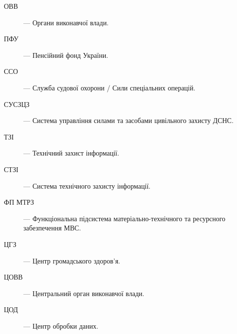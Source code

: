 \begin{description}
    \item[ОВВ] — Органи виконавчої влади.
    \item[ПФУ] — Пенсійний фонд України.
    \item[ССО] — Служба судової охорони / Сили спеціальних операцій.
    \item[СУСЗЦЗ] — Система управління силами та засобами цивільного захисту ДСНС.
    \item[ТЗІ] — Технічний захист інформації.
    \item[СТЗІ] — Система технічного захисту інформації.
    \item[ФП МТРЗ] — Функціональна підсистема матеріально-технічного та ресурсного забезпечення МВС.
    \item[ЦГЗ] — Центр громадського здоров'я.
    \item[ЦОВВ] — Центральний орган виконавчої влади.
    \item[ЦОД] — Центр обробки даних.
\end{description}

